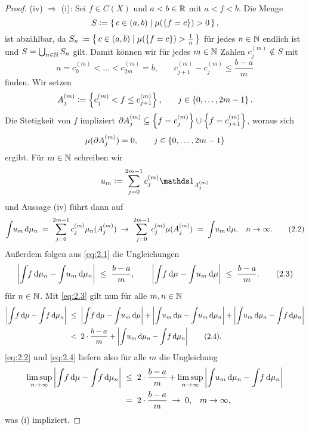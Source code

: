 \documentclass[../main/main.tex]{subfiles}
\begin{document}
\begin{proof}
		(iv) $\Rightarrow$ (i): Sei $f \in C(X)$ und $a < b \in \mathbb{R}$ 
		mit $a < f < b$. Die Menge
		$$S \vcentcolon = \left\{\, c \in (a, b) \; | \; \mu(\left\{f = c\right\}) > 0 \,\right\} \text{,}$$
		ist abzählbar, da 
		$S_n \vcentcolon = \left\{\, c \in (a, b) \; | \; \mu(\left\{f = c\right\}) > \frac{1}{n} \,\right\}$ 
		für jedes $n \in \mathbb{N}$ endlich ist und $S = \bigcup_{n \in \mathbb{N}} S_n$ gilt.
		Damit können wir für jedes $m \in \mathbb{N}$ Zahlen $c_j^{(m)} \notin S$ mit
		\[a = c_0^{(m)} < \dots < c_{2m}^{(m)} = 
			b \text{,} \qquad c_{j+1}^{(m)} - c_j^{(m)} \leq \frac{b-a}{m} 
			\label{eq:2.1} \tag{2.1}\]
		finden. Wir setzen
		$$A_j^{(m)} \vcentcolon = \left\{c_j^{(m)} < f \leq c_{j+1}^{(m)}\right\}\text{,}
			 \qquad j \in \left\{0,\dots,2m-1\right\} \text{.}$$ 
		Die Stetigkeit von $f$ impliziert 
		$\partial A_j^{(m)} \subseteq \left\{f = c_j^{(m)}\right\} \cup \left\{f = c_{j+1}^{(m)}\right\}$, 
		woraus sich 
		$$\mu(\partial A_j^{(m)}) = 0 \text{,} \qquad j \in \left\{0,\dots,2m-1\right\}$$
		ergibt. Für $m \in \mathbb{N}$ schreiben wir
		$$u_m \defby \sum_{j=0}^{2m-1} c_j^{(m)} \indfct_{A_j^{(m)}}$$
		und Aussage (iv) führt dann auf
		\[\int_{} \, u_m \, \mathrm{d}\mu_n \; = \; \sum_{j=0}^{2m-1} c_j^{(m)} \mu_n(A_j^{(m)}) 
			\; \to \; \sum_{j=0}^{2m-1} c_j^{(m)} \mu(A_j^{(m)}) \; = \; 
			\int_{} \, u_m \, \mathrm{d}\mu \text{,} \quad n \to \infty \text{.} \label{eq:2.2} \tag{2.2}\]
		Außerdem folgen aus \eqref{eq:2.1} die Ungleichungen
		\[\left| \int_{} \, f \, \mathrm{d}\mu_n - \int_{} \, u_m \, \mathrm{d}\mu_n \right| \; \leq \; 
			\frac{b-a}{m} \text{,} \qquad 
			\left| \int_{} \, f \, \mathrm{d}\mu - \int_{} \, u_m \, \mathrm{d}\mu \right| \; \leq \; 
			\frac{b-a}{m} \text{.} \label{eq:2.3} \tag{2.3}\]
		für $n \in \mathbb{N}$.
		Mit \eqref{eq:2.3} gilt nun für alle $m, n \in \mathbb{N}$
		\begin{align*}
			\left| \int_{} \, f \, \mathrm{d}\mu - \int_{} \, f \, \mathrm{d}\mu_n \right| \; &\leq \; 
			\left| \int_{} \, f \, \mathrm{d}\mu - \int_{} \, u_m \, \mathrm{d}\mu \right| + 
			\left| \int_{} \, u_m \, \mathrm{d}\mu - \int_{} \, u_m \, \mathrm{d}\mu_n \right| + 
			\left| \int_{} \, u_m \, \mathrm{d}\mu_n - \int_{} \, f \, \mathrm{d}\mu_n \right| \\
			&< \; 2 \cdot \frac{b-a}{m} + \left| \int_{} \, u_m \, \mathrm{d}\mu_n - \int_{} \, f \, \mathrm{d}\mu_n \right| \label{eq:2.4} \tag{2.4}\text{.}
		\end{align*}
		\eqref{eq:2.2} und \eqref{eq:2.4} liefern also für alle $m$ die Ungleichung
		\begin{align*}
			\limsup_{n \to \infty} \left| \int_{} \, f \, \mathrm{d}\mu - \int_{} \, f \, \mathrm{d}\mu_n \right|
			\; &\leq \; 2 \cdot \frac{b-a}{m} + \limsup_{n \to \infty} \left| \int_{} \, u_m \, \mathrm{d}\mu_n - \int_{} \, f \, \mathrm{d}\mu_n \right| \\
			&= \; 2 \cdot \frac{b-a}{m} \; \to \; 0 \text{,} \quad m \to \infty \text{,}
		\end{align*}
		was (i) impliziert.
	\end{proof}

	
	
\end{document}
